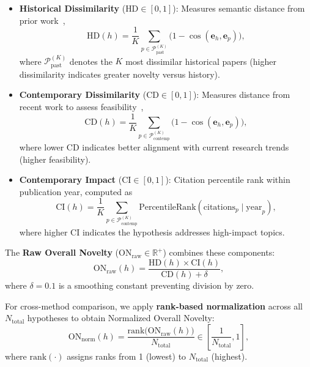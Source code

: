 \documentclass[runningheads]{llncs}
\begin{document}
\begin{itemize}[leftmargin=*, itemsep=2pt]
    \item \textbf{Historical Dissimilarity} ($\text{HD} \in [0, 1]$): Measures semantic distance from prior work~\cite{shao2020bertpli},
    \begin{equation}
        \text{HD}(h) = \frac{1}{K} \sum_{p \in \mathcal{P}_{\text{past}}^{(K)}} \big(1 - \cos(\mathbf{e}_h, \mathbf{e}_p)\big),
        \label{eq:hd}
    \end{equation}
    where $\mathcal{P}_{\text{past}}^{(K)}$ denotes the $K$ most dissimilar historical papers (higher dissimilarity indicates greater novelty versus history).
    
    \item \textbf{Contemporary Dissimilarity} ($\text{CD} \in [0, 1]$): Measures distance from recent work to assess feasibility~\cite{wu2019large,fortunato2018science},
    \begin{equation}
        \text{CD}(h) = \frac{1}{K} \sum_{p \in \mathcal{P}_{\text{contemp}}^{(K)}} \big(1 - \cos(\mathbf{e}_h, \mathbf{e}_p)\big),
        \label{eq:cd}
    \end{equation}
    where lower CD indicates better alignment with current research trends (higher feasibility).
    
    \item \textbf{Contemporary Impact} ($\text{CI} \in [0, 1]$): Citation percentile rank within publication year, computed as~\cite{yang2022gender,alshebli2018preeminence}
    \begin{equation}
        \text{CI}(h) = \frac{1}{K} \sum_{p \in \mathcal{P}_{\text{contemp}}^{(K)}} \text{PercentileRank}(\text{citations}_p \mid \text{year}_p),
        \label{eq:ci}
    \end{equation}
    where higher CI indicates the hypothesis addresses high-impact topics.
\end{itemize}

The \textbf{Raw Overall Novelty} ($\text{ON}_{\text{raw}} \in \mathbb{R}^+$) combines these components:
\begin{equation}
   \text{ON}_{\text{raw}}(h) = \frac{\text{HD}(h) \times \text{CI}(h)}{\text{CD}(h) + \delta},
   \label{eq:on_raw}
\end{equation}
where $\delta = 0.1$ is a smoothing constant preventing division by zero.

For cross-method comparison, we apply \textbf{rank-based normalization} across all $N_{\text{total}}$ hypotheses to obtain Normalized Overall Novelty:
\begin{equation}
    \text{ON}_{\text{norm}}(h) = \frac{\text{rank}\big(\text{ON}_{\text{raw}}(h)\big)}{N_{\text{total}}} \in \left[\frac{1}{N_{\text{total}}}, 1\right],
    \label{eq:on_norm}
\end{equation}
where $\text{rank}(\cdot)$ assigns ranks from 1 (lowest) to $N_{\text{total}}$ (highest).
\end{document}

